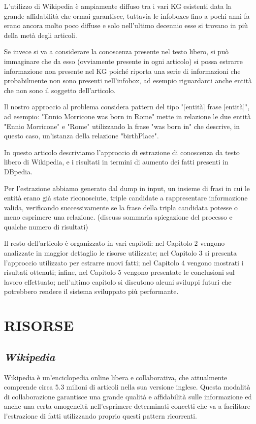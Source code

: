 \documentclass[10pt,a4paper,twocolumn]{article}
\begin{document}
L'utilizzo di Wikipedia è ampiamente diffuso tra i vari KG esistenti data la grande affidabilità che ormai garantisce, tuttavia le infoboxes fino a pochi anni fa erano ancora molto poco diffuse e solo nell'ultimo decennio esse si trovano in più della metà degli articoli.

Se invece si va a considerare la conoscenza presente nel testo libero, si può immaginare che da esso (ovviamente presente in ogni articolo) si possa estrarre informazione non presente nel KG poiché riporta una serie di informazioni che probabilmente non sono presenti nell'infobox, ad esempio riguardanti anche entità che non sono il soggetto dell'articolo.

Il nostro approccio al problema considera pattern del tipo 
"[entità] frase [entità]", ad esempio: "Ennio Morricone was born in Rome" mette in relazione le due entità "Ennio Morricone" e "Rome" utilizzando la frase "was born in" che descrive, in questo caso, un'istanza della relazione "birthPlace".

In questo articolo descriviamo l'approccio di estrazione di conoscenza da testo libero di Wikipedia, e i risultati in termini di aumento dei fatti presenti in DBpedia.

Per l'estrazione abbiamo generato dal dump in input, un insieme di frasi in cui le entità erano già state riconosciute, triple candidate a rappresentare informazione valida, verificando successivamente se la frase della tripla candidata potesse o meno esprimere una relazione.
(discuss sommaria spiegazione del processo e qualche numero di risultati)

Il resto dell'articolo è organizzato in vari capitoli: nel Capitolo 2 vengono analizzate in maggior dettaglio le risorse utilizzate; nel Capitolo 3 si presenta l'approccio utilizzato per estrarre nuovi fatti; nel Capitolo 4 vengono mostrati i risultati ottenuti; infine, nel Capitolo 5 vengono presentate le conclusioni sul lavoro effettuato; nell'ultimo capitolo si discutono alcuni sviluppi futuri che potrebbero rendere il sistema sviluppato più performante.

\section{RISORSE}
\subsection*{\textit{Wikipedia}}

Wikipedia è un'enciclopedia online libera e collaborativa, che attualmente comprende circa 5.3 milioni di articoli nella sua versione inglese. Questa modalità di collaborazione garantisce una grande qualità e affidabilità sulle informazione ed anche una certa omogeneità nell'esprimere determinati concetti che va a facilitare l'estrazione di fatti utilizzando proprio questi pattern ricorrenti.
 
\end{document}
